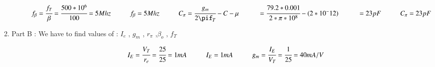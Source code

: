 \begin{enumerate}[label=\thesubsection.\arabic*.,ref=\thesubsection.\theenumi]
\begin{align}
     \hspace{1cm}  f_{\beta} = \cfrac{f_{T}}{\beta}
              = \cfrac{500 * 10^6}{100}
              = 5 Mhz
              
              \vspace{0.5cm}
        
    \hspace{1cm}    f_{\beta} = 5 Mhz
        \vspace{1cm}

 \hspace{1cm}     C_{\pi} = \cfrac{g_{m}}{2\pif_{T}}- C-{\mu}
             
              \vspace{0.5cm}
              
            \hspace{1cm}  = \cfrac{79.2 * 0.001}{2*\pi*{10^8}}- (2*{10^-12})
              
              \vspace{0.5cm}
              
            \hspace{1cm}  = 23 pF
              
              \vspace{0.5cm}
        
    \hspace{1cm}    C_{\pi} = 23 pF
        
        \vspace{1cm}
\end{align}

\item
Part B : We have to find values of :
 $I_{e}$ , $g_{m}$ , $r_{\pi}$ ,$\beta_{o}$ , $f_{T}$
 
  \vspace{0.5cm}
 
 \solution

\begin{align}

\hspace{1cm}  I_{E} = \cfrac{V_{T}}{r_{e}}
        = \cfrac{25}{25}
        = 1 mA
        
        \vspace{0.5cm}
        
    \hspace{1cm}    I_{E}=1 mA
        
        \vspace{1cm}

    \hspace{1cm}  g_{m} = \cfrac{I_{E}}{V_{T}}
        = \cfrac{1}{25}
        = 40 mA/V
        

\end{align}
\end{enumerate}
